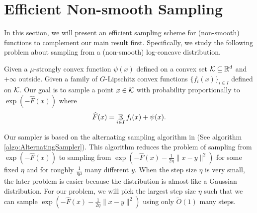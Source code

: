 \section{Efficient Non-smooth Sampling}\label{sec:sampling}
In this section, we will present an efficient sampling scheme for (non-smooth) functions to complement our main result first.
Specifically, we study the following problem about sampling from a (non-smooth) log-concave distribution.
\begin{problem}\label{problem:sample}
Given a $\mu$-strongly convex function $\psi(x)$ defined on a convex set $\mathcal K \subseteq \mathbb{R}^{d}$ and $+\infty$ outside. Given a family of $G$-Lipschitz convex functions $\{f_{i}(x)\}_{i\in I}$ defined on $\mathcal K$. Our goal is to sample a point
$x\in \mathcal K$ with probability proportionally to $\exp(-\widehat{F}(x))$ where
\[
\widehat{F}(x)=\operatorname*{\mathbb{E}}_{i\in I}f_{i}(x)+\psi(x).
\]
\end{problem}

Our sampler is based on the alternating sampling algorithm in \cite{LST21}
(See algorithm \ref{algo:AlternatingSampler}). This algorithm reduces
the problem of sampling from $\exp(-\widehat{F}(x))$ to sampling from $\exp(-\widehat{F}(x)-\frac{1}{2\eta}\|x-y\|^{2})$
for some fixed $\eta$ and for roughly $\frac{1}{\eta\mu}$ many different
$y$. When the step size $\eta$ is very small, the later problem
is easier because the distribution is almost like a Gaussian distribution.
For our problem, we will pick the largest step size $\eta$ such that
we can sample $\exp(-\widehat{F}(x)-\frac{1}{2\eta}\|x-y\|^{2})$ using only
$\widetilde{O}(1)$ many steps. 

